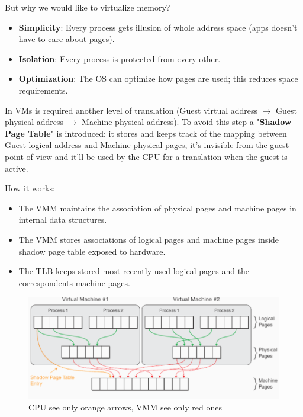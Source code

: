 But why we would like to virtualize memory?
\begin{itemize}
    \item \textbf{Simplicity}: Every process gets illusion of whole address space (apps doesn't have to care about pages).
    \item \textbf{Isolation}: Every process is protected from every other.
    \item \textbf{Optimization}: The OS can optimize how pages are used; this reduces space requirements.
\end{itemize}

In VMs is required another level of translation (Guest virtual address $\rightarrow$ Guest physical address $\rightarrow$ Machine physical address). To avoid this step a "\textbf{Shadow Page Table}" is introduced: it stores and keeps track of the mapping between Guest logical address and Machine physical pages, it's invisible from the guest point of view and it'll be used by the CPU for a translation when the guest is active.

How it works:
\begin{itemize}
    \item The VMM maintains the association of physical pages and machine pages in internal data structures.
    \item The VMM stores associations of logical pages and machine pages inside shadow page table exposed to hardware.
    \item The TLB keeps stored most recently used logical pages and the correspondents machine pages.
\end{itemize}
\begin{figure}[h!]
    \centering
    \includegraphics[scale=0.3]{images/mapping2_mm.png}
    \caption{CPU see only orange arrows, VMM see only red ones}
    \label{fig:mapping2_mm}
\end{figure}

